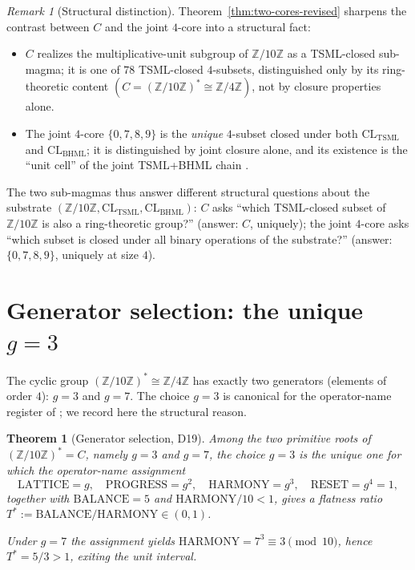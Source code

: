 \documentclass[11pt,reqno]{amsart}
\theoremstyle{plain}
\newtheorem{theorem}{Theorem}[section]
\theoremstyle{definition}
\theoremstyle{remark}
\newtheorem*{remark}{Remark}
\newcommand{\Z}{\mathbb{Z}}
\newcommand{\TSML}{\mathrm{TSML}}
\newcommand{\BHML}{\mathrm{BHML}}
\begin{document}
\begin{remark}[Structural distinction]
Theorem~\ref{thm:two-cores-revised} sharpens the contrast between $C$
and the joint $4$-core into a structural fact:
\begin{itemize}
\item $C$ realizes the multiplicative-unit subgroup of $\Z/10\Z$ as a
TSML-closed sub-magma; it is one of $78$ TSML-closed $4$-subsets,
distinguished only by its ring-theoretic content
$(C = (\Z/10\Z)^* \cong \Z/4\Z)$, not by closure properties alone.
\item The joint $4$-core $\{0, 7, 8, 9\}$ is the \emph{unique}
$4$-subset closed under both $\mathrm{CL}_\TSML$ and
$\mathrm{CL}_\BHML$; it is distinguished by joint closure alone, and
its existence is the ``unit cell'' of the joint TSML+BHML chain
\cite{SandersGishFourCore}.
\end{itemize}
The two sub-magmas thus answer different structural questions about
the substrate $(\Z/10\Z, \mathrm{CL}_\TSML, \mathrm{CL}_\BHML)$:
$C$ asks ``which TSML-closed subset of $\Z/10\Z$ is also a
ring-theoretic group?'' (answer: $C$, uniquely);
the joint $4$-core asks ``which subset is closed under all binary
operations of the substrate?'' (answer: $\{0, 7, 8, 9\}$, uniquely
at size $4$).
\end{remark}

\section{Generator selection: the unique $g = 3$}
\label{sec:generator}

The cyclic group $(\Z/10\Z)^* \cong \Z/4\Z$ has exactly two generators
(elements of order $4$): $g = 3$ and $g = 7$.
The choice $g = 3$ is canonical for the operator-name register of
\cite{SandersForcing}; we record here the structural reason.

\begin{theorem}[Generator selection, D19]\label{thm:generator}
Among the two primitive roots of $(\Z/10\Z)^* = C$, namely $g = 3$
and $g = 7$, the choice $g = 3$ is the unique one for which the
operator-name assignment
\[
\mathrm{LATTICE} = g, \quad
\mathrm{PROGRESS} = g^2, \quad
\mathrm{HARMONY} = g^3, \quad
\mathrm{RESET} = g^4 = 1,
\]
together with $\mathrm{BALANCE} = 5$ and $\mathrm{HARMONY}/10 < 1$,
gives a flatness ratio
$T^* := \mathrm{BALANCE}/\mathrm{HARMONY} \in (0, 1)$.

Under $g = 7$ the assignment yields $\mathrm{HARMONY} = 7^3 \equiv 3
\pmod{10}$, hence $T^* = 5/3 > 1$, exiting the unit interval.
\end{theorem}
\end{document}
